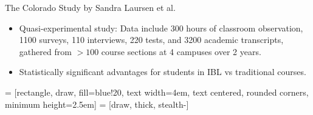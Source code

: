 \documentclass[10pt,handout]{beamer}
\begin{document}

\begin{frame}

\begin{block}{The Colorado Study by Sandra Laursen et al.}
\begin{itemize}
\item Quasi-experimental study: Data include 300 hours of classroom observation, 1100 surveys, 110 interviews, 220 tests, and 3200 academic transcripts, gathered from $>100$ course sections at 4 campuses over 2 years.
\item Statistically significant advantages for students in IBL vs traditional courses.
\end{itemize}
\end{block}

\vspace{-1em}

\begin{center}
 = [rectangle, draw, fill=blue!20, text width=4em, text centered, rounded corners, minimum height=2.5em]
 = [draw, thick, stealth-]
\end{center}


\end{frame}

\end{document}
